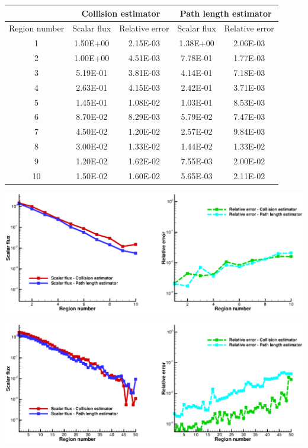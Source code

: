 \documentclass[12pt]{article}
\begin{document}
\begin{center}
  \begin{tabular}{|c|c|c|c|c|}
    \hline
    & \multicolumn{2}{c|}{\textbf{Collision estimator}}
    & \multicolumn{2}{c|}{\textbf{Path length estimator}}\\
     \cline{2-5}
    \hline
    Region number & Scalar flux & Relative error & Scalar flux &
    Relative error\\
    \hline
    1	 & 1.50E+00 & 2.15E-03 & 1.38E+00 & 2.06E-03 \\
    2	 & 1.00E+00 & 4.51E-03 & 7.78E-01 & 1.77E-03 \\
    3	 & 5.19E-01 & 3.81E-03 & 4.14E-01 & 7.18E-03 \\
    4	 & 2.63E-01 & 4.15E-03 & 2.42E-01 & 3.71E-03 \\
    5	 & 1.45E-01 & 1.08E-02 & 1.03E-01 & 8.53E-03 \\
    6	 & 8.70E-02 & 8.29E-03 & 5.79E-02 & 7.47E-03 \\
    7	 & 4.50E-02 & 1.20E-02 & 2.57E-02 & 9.84E-03 \\
    8	 & 3.00E-02 & 1.33E-02 & 1.44E-02 & 1.33E-02 \\
    9	 & 1.20E-02 & 1.62E-02 & 7.55E-03 & 2.00E-02 \\
    10 & 1.50E-02 & 1.60E-02 & 5.65E-03 & 2.11E-02 \\
    \hline
  \end{tabular}
  \includegraphics[width=1.0\textwidth]{problem1_10.eps}
\end{center}

\begin{center}
  \includegraphics[width=1.0\textwidth]{problem1_50.eps}
\end{center}
\end{document}
